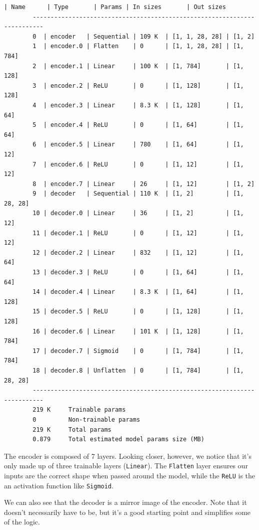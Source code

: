 \documentclass[11pt]{article}
\makeatletter
\newcommand{\boxspacing}{\kern\kvtcb@left@rule\kern\kvtcb@boxsep}
\newcommand{\prompt}[4]{
        {\ttfamily\llap{{\color{#2}[#3]:\hspace{3pt}#4}}\vspace{-\baselineskip}}
    }
\makeatother
\begin{document}
\begin{tcolorbox}[breakable, size=fbox, boxrule=.5pt, pad at break*=1mm, opacityfill=0]
    \prompt{Out}{outcolor}{8}{\boxspacing}
    \begin{Verbatim}[commandchars=\\\{\}]
        | Name      | Type       | Params | In sizes       | Out sizes
        -------------------------------------------------------------------------
        0  | encoder   | Sequential | 109 K  | [1, 1, 28, 28] | [1, 2]
        1  | encoder.0 | Flatten    | 0      | [1, 1, 28, 28] | [1, 784]
        2  | encoder.1 | Linear     | 100 K  | [1, 784]       | [1, 128]
        3  | encoder.2 | ReLU       | 0      | [1, 128]       | [1, 128]
        4  | encoder.3 | Linear     | 8.3 K  | [1, 128]       | [1, 64]
        5  | encoder.4 | ReLU       | 0      | [1, 64]        | [1, 64]
        6  | encoder.5 | Linear     | 780    | [1, 64]        | [1, 12]
        7  | encoder.6 | ReLU       | 0      | [1, 12]        | [1, 12]
        8  | encoder.7 | Linear     | 26     | [1, 12]        | [1, 2]
        9  | decoder   | Sequential | 110 K  | [1, 2]         | [1, 28, 28]
        10 | decoder.0 | Linear     | 36     | [1, 2]         | [1, 12]
        11 | decoder.1 | ReLU       | 0      | [1, 12]        | [1, 12]
        12 | decoder.2 | Linear     | 832    | [1, 12]        | [1, 64]
        13 | decoder.3 | ReLU       | 0      | [1, 64]        | [1, 64]
        14 | decoder.4 | Linear     | 8.3 K  | [1, 64]        | [1, 128]
        15 | decoder.5 | ReLU       | 0      | [1, 128]       | [1, 128]
        16 | decoder.6 | Linear     | 101 K  | [1, 128]       | [1, 784]
        17 | decoder.7 | Sigmoid    | 0      | [1, 784]       | [1, 784]
        18 | decoder.8 | Unflatten  | 0      | [1, 784]       | [1, 28, 28]
        -------------------------------------------------------------------------
        219 K     Trainable params
        0         Non-trainable params
        219 K     Total params
        0.879     Total estimated model params size (MB)
    \end{Verbatim}
\end{tcolorbox}

The encoder is composed of 7 layers. Looking closer, however, we notice
that it's only made up of three trainable layers (\texttt{Linear}). The
\texttt{Flatten} layer ensures our inputs are the correct shape when
passed around the model, while the \texttt{ReLU} is the an activation
function like \texttt{Sigmoid}.

We can also see that the decoder is a mirror image of the encoder. Note
that it doesn't necessarily have to be, but it's a good starting point
and simplifies some of the logic.
\end{document}
